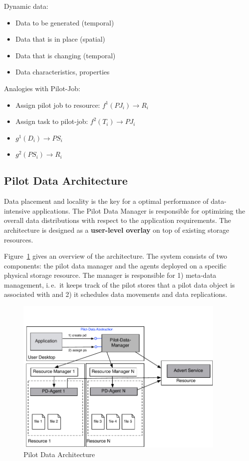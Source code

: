 \documentclass[]{article}
\begin{document}
	
\noindent	
Dynamic data:
\begin{itemize}
	\item Data to be generated (temporal)
	\item Data that is in place (spatial)
	\item Data that is changing (temporal)
	\item Data characteristics, properties
\end{itemize}	

\noindent
Analogies with Pilot-Job:
\begin{itemize}
	\item Assign pilot job to resource: $f^{1}(PJ_i) \rightarrow R_i$
	\item Assign task to pilot-job: $f^{2}(T_i) \rightarrow PJ_i$ 

	\item $g^{1} (D_i) \rightarrow PS_i$
	\item $g^{2} (PS_i) \rightarrow R_i$
\end{itemize}

\subsection{Pilot Data Architecture}


Data placement and locality is the key for a optimal performance of 
data-intensive applications. The Pilot Data Manager is responsible for 
optimizing the overall data distributions with respect to the application 
requirements. The architecture is designed as a \textbf{user-level overlay} on 
top of existing storage resources.

Figure~\ref{fig:figures_distributed_pilot_job} gives an overview of the
architecture. The system consists of two components: the pilot data manager and
the agents deployed on a specific physical storage resource. The manager is
responsible for 1) meta-data management, i.\,e.\ it keeps track of the pilot
stores that a pilot data object is associated with and 2) it schedules data
movements and data replications.

\begin{figure}[htbp]
    \centering
        \includegraphics[height=3in]{figures/pilot-data-manager.pdf}
    \caption{Pilot Data Architecture}
    \label{fig:figures_distributed_pilot_job}
\end{figure}
\end{document}
